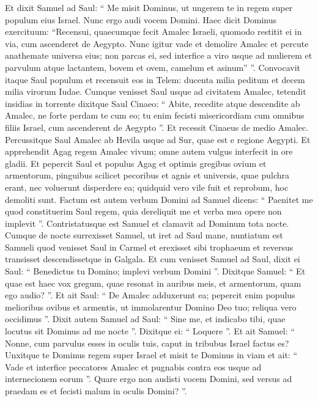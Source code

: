 \begin{biblechapter}
\begin{biblechapter}
\begin{biblechapter}
\begin{biblechapter}
\begin{biblechapter}
\begin{biblechapter}
\begin{biblechapter}
\begin{biblechapter}
\begin{biblechapter}
\begin{biblechapter}
\begin{biblechapter}
\begin{biblechapter}
\begin{biblechapter}
\begin{biblechapter}
\begin{biblechapter}
\verse Et dixit Samuel ad Saul: “ Me misit Dominus, ut ungerem te in regem super populum eius Israel. Nunc ergo audi vocem Domini. 
\verse Haec dicit Dominus exercituum: “Recensui, quaecumque fecit Amalec Israeli, quomodo restitit ei in via, cum ascenderet de Aegypto. 
\verse Nunc igitur vade et demolire Amalec et percute anathemate universa eius; non parcas ei, sed interfice a viro usque ad mulierem et parvulum atque lactantem, bovem et ovem, camelum et asinum” ”.
 \verse Convocavit itaque Saul populum et recensuit eos in Telem: ducenta milia peditum et decem milia virorum Iudae. 
\verse Cumque venisset Saul usque ad civitatem Amalec, tetendit insidias in torrente 
\verse dixitque Saul Cinaeo: “ Abite, recedite atque descendite ab Amalec, ne forte perdam te cum eo; tu enim fecisti misericordiam cum omnibus filiis Israel, cum ascenderent de Aegypto ”. Et recessit Cinaeus de medio Amalec.
 \verse Percussitque Saul Amalec ab Hevila usque ad Sur, quae est e regione Aegypti. 
 \verse Et apprehendit Agag regem Amalec vivum; omne autem vulgus interfecit in ore gladii. 
\verse Et pepercit Saul et populus Agag et optimis gregibus ovium et armentorum, pinguibus scilicet pecoribus et agnis et universis, quae pulchra erant, nec voluerunt disperdere ea; quidquid vero vile fuit et reprobum, hoc demoliti sunt.
 \verse Factum est autem verbum Domini ad Samuel dicens: 
\verse “ Paenitet me quod constituerim Saul regem, quia dereliquit me et verba mea opere non implevit ”. Contristatusque est Samuel et clamavit ad Dominum tota nocte.
 \verse Cumque de nocte surrexisset Samuel, ut iret ad Saul mane, nuntiatum est Samueli quod venisset Saul in Carmel et erexisset sibi trophaeum et reversus transisset descendissetque in Galgala. 
\verse Et cum venisset Samuel ad Saul, dixit ei Saul: “ Benedictus tu Domino; implevi verbum Domini ”. 
\verse Dixitque Samuel: “ Et quae est haec vox gregum, quae resonat in auribus meis, et armentorum, quam ego audio? ”. 
\verse Et ait Saul: “ De Amalec adduxerunt ea; pepercit enim populus melioribus ovibus et armentis, ut immolarentur Domino Deo tuo; reliqua vero occidimus ”.
 \verse Dixit autem Samuel ad Saul: “ Sine me, et indicabo tibi, quae locutus sit Dominus ad me nocte ”. Dixitque ei: “ Loquere ”. 
\verse Et ait Samuel: “ Nonne, cum parvulus esses in oculis tuis, caput in tribubus Israel factus es? Unxitque te Dominus regem super Israel 
\verse et misit te Dominus in viam et ait: “ Vade et interfice peccatores Amalec et pugnabis contra eos usque ad internecionem eorum ”. 
\verse Quare ergo non audisti vocem Domini, sed versus ad praedam es et fecisti malum in oculis Domini? ”. 

\end{biblechapter}
\end{biblechapter}
\end{biblechapter}
\end{biblechapter}
\end{biblechapter}
\end{biblechapter}
\end{biblechapter}
\end{biblechapter}
\end{biblechapter}
\end{biblechapter}
\end{biblechapter}
\end{biblechapter}
\end{biblechapter}
\end{biblechapter}
\end{biblechapter}
